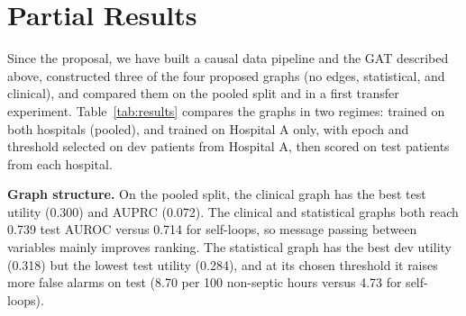 \documentclass{article}
\begin{document}
\section{Partial Results}
\label{sec:results}
 
Since the proposal, we have built a causal data pipeline and the GAT described above, constructed three of the four proposed graphs (no edges, statistical, and clinical), and compared them on the pooled split and in a first transfer experiment. Table~\ref{tab:results} compares the graphs in two regimes: trained on both hospitals (pooled), and trained on Hospital A only, with epoch and threshold selected on dev patients from Hospital A, then scored on test patients from each hospital.
 
\begin{table}[h]
\centering
\small
\caption{GAT with fixed hyperparameters under different graph topologies (single seed).}
\setlength{\tabcolsep}{4pt}
\label{tab:results}
\end{table}
 
\textbf{Graph structure.} On the pooled split, the clinical graph has the best test utility (0.300) and AUPRC (0.072). The clinical and statistical graphs both reach 0.739 test AUROC versus 0.714 for self-loops, so message passing between variables mainly improves ranking. The statistical graph has the best dev utility (0.318) but the lowest test utility (0.284), and at its chosen threshold it raises more false alarms on test (8.70 per 100 non-septic hours versus 4.73 for self-loops).
 
\end{document}
